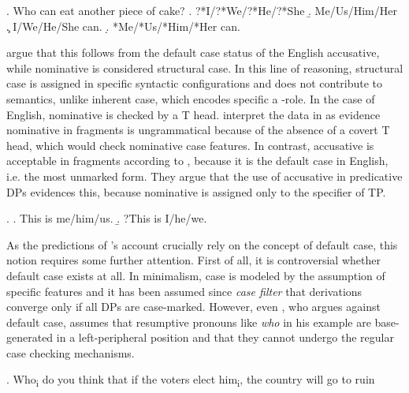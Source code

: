 \ex. Who can eat another piece of cake? \hfill \citep[77]{barton.progovac2005} \label{ex:barton.cake}
\a. ?*I/?*We/?*He/?*She
\b. Me/Us/Him/Her
\c. I/We/He/She can.
\d. *Me/*Us/*Him/*Her can.

\largerpage
\citeauthor{barton.progovac2005} argue that this follows from the default case status of the English accusative, while nominative is considered structural case. In this line of reasoning, structural case is assigned in specific syntactic configurations and does not contribute to semantics, unlike inherent case, which encodes specific a \texttheta-role. In the case of English, nominative is checked by a T head. \citet{barton.progovac2005} interpret the data in \Last as evidence nominative in fragments is ungrammatical because of the absence of a covert T head, which would check nominative case features. In contrast, accusative is acceptable in fragments according to \citet[78]{barton.progovac2005}, because it is the default case in English, i.e. the most unmarked form. They argue that the use of accusative in predicative DPs \Next evidences this, because nominative is assigned only to the specifier of TP.

\ex. \a. This is me/him/us.\hfill \citep[79]{barton.progovac2005}
    \b. ?This is I/he/we.

As the predictions of \citeauthor{barton.progovac2005}'s account crucially rely on the concept of default case, this notion requires some further attention. First of all, it is controversial whether default case exists at all. In minimalism, case is modeled by the assumption of specific features and it has been assumed since  \textit{case filter} that derivations converge only if all DPs are case-marked. However, even \citet{merchant2004a}, who argues against default case, assumes that resumptive pronouns like \textit{who} in his example \Next are base-generated in a left-peripheral position and that they cannot undergo the regular case checking mechanisms. 

\ex. Who\textsubscript{i} do you think that if the voters elect him\textsubscript{i}, the country will go to ruin

